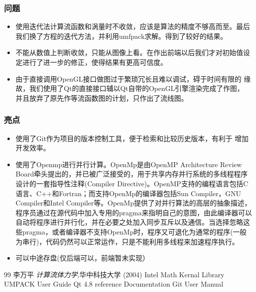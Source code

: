 \documentclass[12pt]{article}
\begin{document}
\subsubsection{问题}
\begin{itemize}
\item 使用迭代法计算流函数和涡量时不收敛，应该是算法的精度不够高而至。最后我们换了方程的迭代方法，并利用umfpack求解。得到了较好的结果。
\item 不能从数值上判断收敛，只能从图像上看。在作出前端以后我们才对初始值设定进行了进一步的修正，使得结果有更高可信度。
\item 由于直接调用OpenGL接口做图过于繁琐冗长且难以调试，碍于时间有限的
  缘故，我们使用了Qt的直接接口辅以Qt自带的OpenGL引擎渲染完成了作图，
  并且放弃了原先作等流函数图的计划，只作出了流线图。

\end{itemize}
\subsubsection{亮点}
\begin{itemize}
\item 使用了Git作为项目的版本控制工具，便于检索和比较历史版本，有利于
  增加开发效率。
\item 使用了Openmp进行并行计算。OpenMp是由OpenMP Architecture Review Board牵头提出的，并已被广泛接受的，用于共享内存并行系统的多线程程序设计的一套指导性注释(Compiler Directive)。OpenMP支持的编程语言包括C语言、C++和Fortran；而支持OpenMp的编译器包括Sun Compiler，GNU Compiler和Intel Compiler等。OpenMp提供了对并行算法的高层的抽象描述，程序员通过在源代码中加入专用的pragma来指明自己的意图，由此编译器可以自动将程序进行并行化，并在必要之处加入同步互斥以及通信。当选择忽略这些pragma，或者编译器不支持OpenMp时，程序又可退化为通常的程序(一般为串行)，代码仍然可以正常运作，只是不能利用多线程来加速程序执行。
\item 可以中途存盘(仅后端可以，前端暂未实现）

\end{itemize}


\begin{thebibliography}
{99}
  李万平
 \emph{计算流体力学},华中科技大学 
(2004)
Intel Math Kernal Library
UMPACK User Guide
Qt 4.8 reference Documentation
Git User Manual


  \end{thebibliography}
\end{document}
